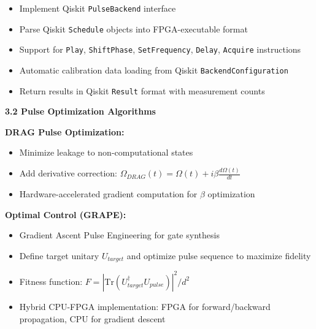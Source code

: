 \documentclass[12pt,a4paper]{article}
\begin{document}
\begin{itemize}[noitemsep]
\item Implement Qiskit \texttt{PulseBackend} interface
\item Parse Qiskit \texttt{Schedule} objects into FPGA-executable format
\item Support for \texttt{Play}, \texttt{ShiftPhase}, \texttt{SetFrequency}, \texttt{Delay}, \texttt{Acquire} instructions
\item Automatic calibration data loading from Qiskit \texttt{BackendConfiguration}
\item Return results in Qiskit \texttt{Result} format with measurement counts
\end{itemize}

\textbf{3.2 Pulse Optimization Algorithms}

\textbf{DRAG Pulse Optimization:}
\begin{itemize}[noitemsep]
\item Minimize leakage to non-computational states
\item Add derivative correction: $\Omega_{DRAG}(t) = \Omega(t) + i\beta \frac{d\Omega(t)}{dt}$
\item Hardware-accelerated gradient computation for $\beta$ optimization
\end{itemize}

\textbf{Optimal Control (GRAPE):}
\begin{itemize}[noitemsep]
\item Gradient Ascent Pulse Engineering for gate synthesis
\item Define target unitary $U_{target}$ and optimize pulse sequence to maximize fidelity
\item Fitness function: $F = |\text{Tr}(U_{target}^\dagger U_{pulse})|^2 / d^2$
\item Hybrid CPU-FPGA implementation: FPGA for forward/backward propagation, CPU for gradient descent
\end{itemize}
\end{document}
